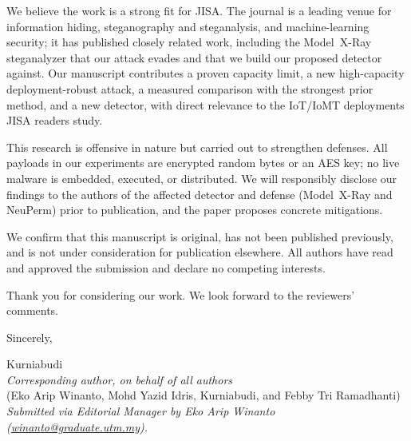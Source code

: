 \documentclass[11pt]{article}
\begin{document}
We believe the work is a strong fit for JISA. The journal is a leading venue for
information hiding, steganography and steganalysis, and machine-learning security; it has
published closely related work, including the Model~X-Ray steganalyzer that our attack
evades and that we build our proposed detector against. Our manuscript contributes a
proven capacity limit, a new high-capacity deployment-robust attack, a measured comparison
with the strongest prior method, and a new detector, with direct relevance to the IoT/IoMT
deployments JISA readers study.

This research is offensive in nature but carried out to strengthen defenses. All payloads
in our experiments are encrypted random bytes or an AES key; no live malware is embedded,
executed, or distributed. We will responsibly disclose our findings to the authors of the
affected detector and defense (Model~X-Ray and NeuPerm) prior to publication, and the
paper proposes concrete mitigations.

We confirm that this manuscript is original, has not been published previously, and is not
under consideration for publication elsewhere. All authors have read and approved the
submission and declare no competing interests.

Thank you for considering our work. We look forward to the reviewers' comments.

\vspace{1em}
\noindent Sincerely,

\vspace{1.5em}
\noindent Kurniabudi\\
\emph{Corresponding author, on behalf of all authors}\\
(Eko Arip Winanto, Mohd Yazid Idris, Kurniabudi, and Febby Tri Ramadhanti)\\[0.3em]
\emph{Submitted via Editorial Manager by Eko Arip Winanto
(\href{mailto:winanto@graduate.utm.my}{winanto@graduate.utm.my}).}
\end{document}
